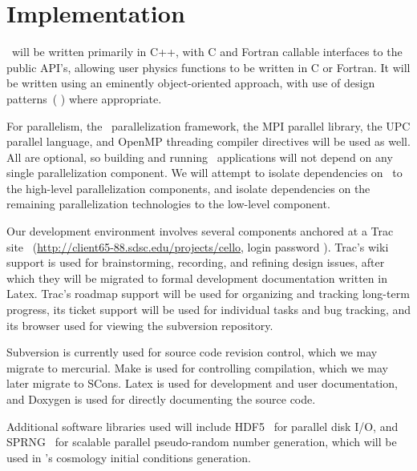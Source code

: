 \documentclass[10pt,twocolumn]{article}
\begin{document}
\section{Implementation} \label{s:implementation}

\cello\ will be written primarily in C++, with C and Fortran callable
interfaces to the public API's, allowing user physics functions to be
written in C or Fortran.  It will be written using an eminently
object-oriented approach, with use of design patterns~(\cite{GaHe95}
\cite{BuHe07}) where appropriate.

For parallelism, the \charm\  parallelization framework, the MPI
parallel library, the UPC parallel language, and OpenMP threading
compiler directives will be used as well.  All are optional, so
building and running \cello\ applications will not depend on any
single parallelization component.  We will attempt to isolate
dependencies on \charm\  to the high-level parallelization components,
and isolate dependencies on the remaining parallelization technologies
to the low-level  component.

Our development environment involves several components anchored at a
Trac site~\cite{wwwtrac}
(\url{http://client65-88.sdsc.edu/projects/cello}, login 
password ).  Trac's wiki support is used for brainstorming,
recording, and refining design issues, after which they will be
migrated to formal development documentation written in Latex.  Trac's
roadmap support will be used for organizing and tracking long-term
progress, its ticket support will be used for individual tasks and bug
tracking, and its browser used for viewing the subversion repository.

Subversion is currently used for source code revision control, which
we may migrate to mercurial.  Make is used for controlling
compilation, which we may later migrate to SCons.  Latex is used for
development and user documentation, and Doxygen is used for directly
documenting the source code.

Additional software libraries used will include HDF5~\cite{hdf5} for
parallel disk I/O, and SPRNG~\cite{wwwsprng} for scalable parallel
pseudo-random number generation, which will be used in \enzoii's
cosmology initial conditions generation.

\end{document}
